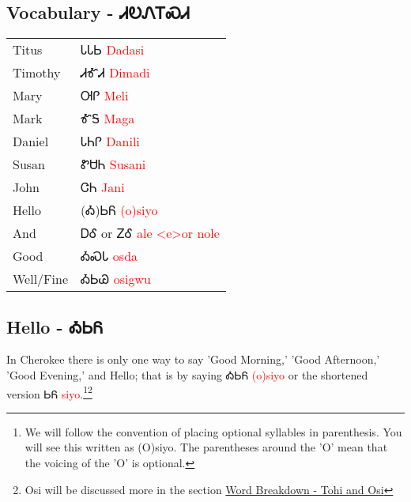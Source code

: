 \subsection{Vocabulary - ᏗᎧᏁᎢᏍᏗ 
}
\begin{tabular}{p{3cm} p{11cm}}
Titus & ᏓᏓᏏ 
 \newline \textcolor{red}{Dadasi}\\
Timothy & ᏗᎹᏗ 
 \newline \textcolor{red}{Dimadi}\\
Mary & ᎺᎵ 
 \newline \textcolor{red}{Meli}\\
Mark & ᎹᎦ 
 \newline \textcolor{red}{Maga}\\
Daniel & ᏓᏂᎵ 
 \newline \textcolor{red}{Danili}\\
Susan & ᏑᏌᏂ 
 \newline \textcolor{red}{Susani}\\
John & ᏣᏂ 
 \newline \textcolor{red}{Jani}\\
Hello & (Ꭳ)ᏏᏲ 
 \newline \textcolor{red}{(o)siyo}\\
And & ᎠᎴ 
  or ᏃᎴ 
 \newline \textcolor{red}{ale <e>or nole}\\
Good & ᎣᏍᏓ 
 \newline \textcolor{red}{osda}\\
Well/Fine & ᎣᏏᏊ 
 \newline \textcolor{red}{osigwu}\\
\end{tabular}

\subsection{Hello - ᎣᏏᏲ}
In Cherokee there is only one way to say 'Good Morning,' 'Good Afternoon,' 'Good Evening,' and Hello; that is by saying ᎣᏏᏲ \textcolor{red}{(o)siyo} or the shortened version ᏏᏲ \textcolor{red}{siyo}.\footnote{We will follow the convention of placing optional syllables in parenthesis.  You will see this written as (O)siyo.  The parentheses around the 'O' mean that the voicing of the 'O' is optional.}\footnote{Osi will be discussed more in the section \hyperref[sec:wordBreakdownTohiOsi]{Word Breakdown - Tohi and Osi}}
